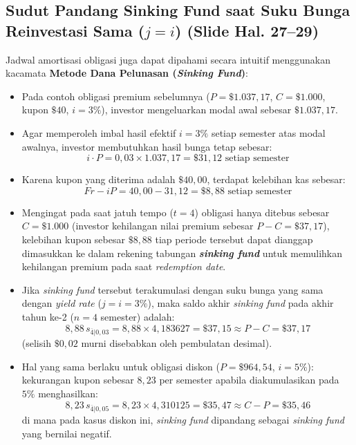 \documentclass[11pt,a4paper]{article}
\begin{document}
\subsection{Sudut Pandang Sinking Fund saat Suku Bunga Reinvestasi Sama (\texorpdfstring{$j = i$}{j = i}) (Slide Hal. 27--29)}

Jadwal amortisasi obligasi juga dapat dipahami secara intuitif menggunakan kacamata \textbf{Metode Dana Pelunasan (\textit{Sinking Fund})}:
\begin{itemize}
    \item Pada contoh obligasi premium sebelumnya ($P = \$1.037{,}17$, $C = \$1.000$, kupon $\$40$, $i = 3\%$), investor mengeluarkan modal awal sebesar $\$1.037{,}17$.
    \item Agar memperoleh imbal hasil efektif $i = 3\%$ setiap semester atas modal awalnya, investor membutuhkan hasil bunga tetap sebesar:
    \begin{equation*}
        i \cdot P = 0{,}03 \times 1.037{,}17 = \$31{,}12 \text{ setiap semester}
    \end{equation*}
    \item Karena kupon yang diterima adalah $\$40{,}00$, terdapat kelebihan kas sebesar:
    \begin{equation*}
        Fr - iP = 40{,}00 - 31{,}12 = \$8{,}88 \text{ setiap semester}
    \end{equation*}
    \item Mengingat pada saat jatuh tempo ($t=4$) obligasi hanya ditebus sebesar $C = \$1.000$ (investor kehilangan nilai premium sebesar $P - C = \$37{,}17$), kelebihan kupon sebesar $\$8{,}88$ tiap periode tersebut dapat dianggap dimasukkan ke dalam rekening tabungan \textbf{\textit{sinking fund}} untuk memulihkan kehilangan premium pada saat \textit{redemption date}.
    \item Jika \textit{sinking fund} tersebut terakumulasi dengan suku bunga yang sama dengan \textit{yield rate} ($j = i = 3\%$), maka saldo akhir \textit{sinking fund} pada akhir tahun ke-2 ($n = 4$ semester) adalah:
    \begin{equation*}
        8{,}88 \, s_{\overline{4}|0{,}03} = 8{,}88 \times 4{,}183627 = \$37{,}15 \approx P - C = \$37{,}17
    \end{equation*}
    (selisih $\$0{,}02$ murni disebabkan oleh pembulatan desimal).
    \item Hal yang sama berlaku untuk obligasi diskon ($P = \$964{,}54$, $i = 5\%$): kekurangan kupon sebesar $8{,}23$ per semester apabila diakumulasikan pada $5\%$ menghasilkan:
    \begin{equation*}
        8{,}23 \, s_{\overline{4}|0{,}05} = 8{,}23 \times 4{,}310125 = \$35{,}47 \approx C - P = \$35{,}46
    \end{equation*}
    di mana pada kasus diskon ini, \textit{sinking fund} dipandang sebagai \textit{sinking fund} yang bernilai negatif.
\end{itemize}
\end{document}
